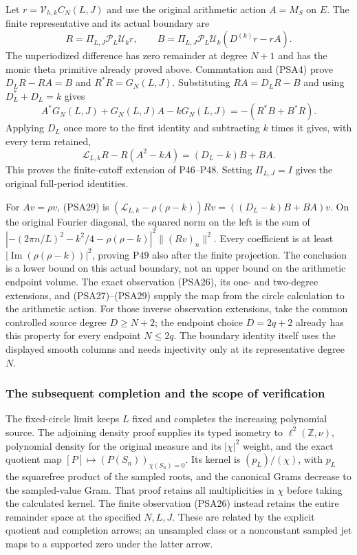 Let $r=\mathcal V_{h,k}C_N(L,J)$ and use the original arithmetic
action $A=M_S$ on $E$. The finite representative and its actual
boundary are
\[
 R=\Pi_{L,J}\mathcal P_L\mathcal U_kr,\qquad
 B=\Pi_{L,J}\mathcal P_L\mathcal U_k(D^{(k)}r-rA).
 \tag{PSA27}
\]
The unperiodized difference has zero remainder at degree $N+1$ and
has the monic theta primitive already proved above. Commutation and
(PSA4) prove $D_LR-RA=B$ and $R^*R=G_N(L,J)$. Substituting
$RA=D_LR-B$ and using $D_L^*+D_L=k$ gives
\[
 A^*G_N(L,J)+G_N(L,J)A-kG_N(L,J)
 =-(R^*B+B^*R).
 \tag{PSA28}
\]
Applying $D_L$ once more to the first identity and subtracting $k$
times it gives, with every term retained,
\[
 \mathscr L_{L,k}R-R(A^2-kA)=(D_L-k)B+BA.
 \tag{PSA29}
\]
This proves the finite-cutoff extension of P46--P48. Setting
$\Pi_{L,J}=I$ gives the original full-period identities.

For $Av=\rho v$, (PSA29) is
$(\mathscr L_{L,k}-\rho(\rho-k))Rv=((D_L-k)B+BA)v$.
On the original Fourier diagonal, the squared norm on the left is
the sum of
$|-(2\pi n/L)^2-k^2/4-\rho(\rho-k)|^2\|(Rv)_n\|^2$.
Every coefficient is at least
$|\operatorname{Im}(\rho(\rho-k))|^2$, proving P49 also after the
finite projection. The conclusion is a lower bound on this actual
boundary, not an upper bound on the arithmetic endpoint volume.
The exact observation (PSA26), its one- and two-degree extensions,
and (PSA27)--(PSA29) supply the map from the circle calculation to
the arithmetic action.
For those inverse observation extensions, take the common controlled
source degree $D\ge N+2$; the endpoint choice $D=2q+2$ already has
this property for every endpoint $N\le2q$. The boundary identity
itself uses the displayed smooth columns and needs injectivity only
at its representative degree $N$.

\subsubsection{The subsequent completion and the scope of verification}

The fixed-circle limit keeps $L$ fixed and completes the increasing
polynomial source. The adjoining density proof supplies its typed
isometry to $\ell^2(\mathbb Z,\nu)$, polynomial density for the
original measure and its $|\chi|^2$ weight, and the exact quotient
map $[P]\mapsto(P(S_n))_{\chi(S_n)=0}$. Its kernel is
$(p_L)/(\chi)$, with $p_L$ the squarefree product of the sampled
roots, and the canonical Grams decrease to the sampled-value Gram.
That proof retains all multiplicities in $\chi$ before taking the
calculated kernel. The finite observation (PSA26) instead retains
the entire remainder space at the specified $N,L,J$. These are
related by the explicit quotient and completion arrows; an
unsampled class or a nonconstant sampled jet maps to a supported
zero under the latter arrow.

